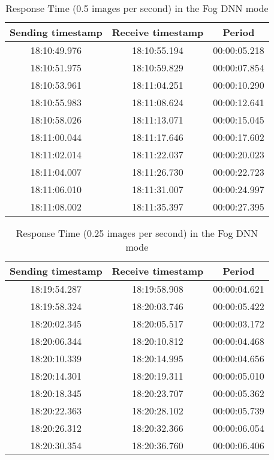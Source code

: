 \begin{table}[h!]
\centering
\begin{tabular}{ |c|c|c| } 
 \hline
 Sending timestamp &    Receive timestamp &    Period\\
 \hline
 
18:10:49.976 &	18:10:55.194 &	00:00:05.218 \\
18:10:51.975 &	18:10:59.829 &	00:00:07.854 \\
18:10:53.961 &	18:11:04.251 &	00:00:10.290 \\
18:10:55.983 &	18:11:08.624 &	00:00:12.641 \\
18:10:58.026 &	18:11:13.071 &	00:00:15.045 \\
18:11:00.044 &	18:11:17.646 &	00:00:17.602 \\
18:11:02.014 &	18:11:22.037 &	00:00:20.023 \\
18:11:04.007 &	18:11:26.730 &	00:00:22.723 \\
18:11:06.010 &	18:11:31.007 &	00:00:24.997 \\
18:11:08.002 &	18:11:35.397 &	00:00:27.395 \\
 \hline
\end{tabular}
\caption{Response Time (0.5 images per second) in the Fog DNN mode}
\label{table:measure_response_time_dnn_2}
\end{table}

\begin{table}[h!]
\centering
\begin{tabular}{ |c|c|c| } 
 \hline
 Sending timestamp &    Receive timestamp &    Period\\
 \hline
 
18:19:54.287 &	18:19:58.908 &	00:00:04.621\\
18:19:58.324 &	18:20:03.746 &	00:00:05.422\\
18:20:02.345 &	18:20:05.517 &	00:00:03.172\\
18:20:06.344 &	18:20:10.812 &	00:00:04.468\\
18:20:10.339 &	18:20:14.995 &	00:00:04.656\\
18:20:14.301 &	18:20:19.311 &	00:00:05.010\\
18:20:18.345 &	18:20:23.707 &	00:00:05.362\\
18:20:22.363 &	18:20:28.102 &	00:00:05.739\\
18:20:26.312 &	18:20:32.366 &	00:00:06.054\\
18:20:30.354 &	18:20:36.760 &	00:00:06.406\\
 \hline
\end{tabular}
\caption{Response Time (0.25 images per second) in the Fog DNN mode}
\label{table:measure_response_time_dnn_4}
\end{table}

